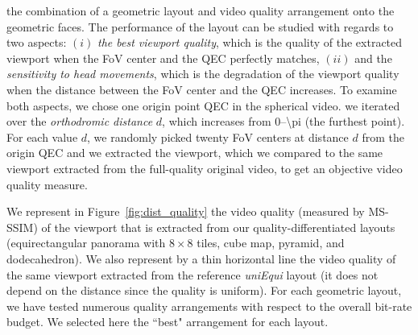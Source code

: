  the
combination of a geometric layout and video quality arrangement onto
the geometric faces. The performance of the layout can be studied with
regards to two aspects: $(i)$ \emph{the best viewport quality}, which
is the quality of the extracted viewport when the \ac{FoV} center and
the \ac{QEC} perfectly matches, $(ii)$ and the \emph{sensitivity to
head movements}, which is the degradation of the viewport quality when
the distance between the FoV center and the \ac{QEC} increases. To
examine both aspects, we chose one origin point \ac{QEC} in the
spherical video.  we iterated over the \emph{orthodromic
distance} $d$, which increases from \numrange{0}{\pi} (the furthest
point). For each value $d$, we randomly picked twenty \ac{FoV} centers
at distance $d$ from the origin \ac{QEC} and we extracted the
viewport, which we compared to the same viewport extracted from the
full-quality original video, to get an objective video quality
measure.



We represent in Figure~\ref{fig:dist_quality} the video quality
(measured by \acs{MS-SSIM}) of the viewport that is extracted from our
quality-differentiated layouts (equirectangular panorama with
$8\!\times\! 8$ tiles, cube map, pyramid, and dodecahedron). We also
represent by a thin horizontal line the video quality of the same
viewport extracted from the reference \textit{uniEqui} layout (it does
not depend on the distance since the quality is uniform). For each
geometric layout, we have tested numerous quality arrangements with
respect to the overall bit-rate budget. We selected here the ``best"
arrangement for each layout. 

